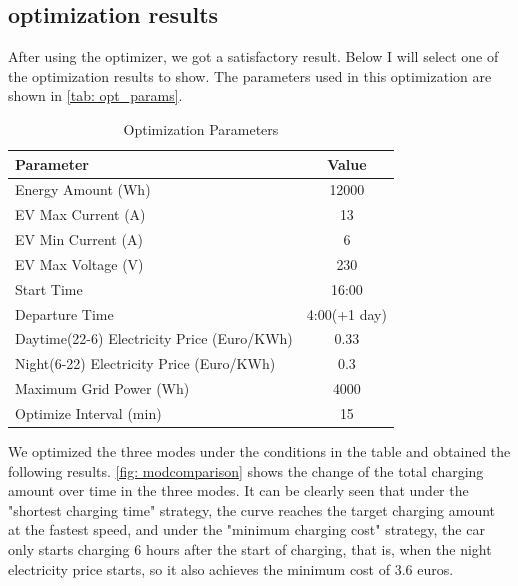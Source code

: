 \documentclass[
	english,
	ruledheaders=section,%
	class=report,%
	thesis={type=Report},%
	accentcolor=9c,%
	custommargins=true,%
	marginpar=false,%
	parskip=half-,%
	fontsize=11pt,%
	logofile={img/tuda_logo.pdf}, %
]{tudapub}
\begin{document}
\subsection{optimization results}

After using the optimizer, we got a satisfactory result. Below I will select one of the optimization results to show. The parameters used in this optimization are shown in \autoref{tab: opt_params}.

\begin{table}[htbp]
\centering
\begin{tabular}{|l|c|}
\hline
\textbf{Parameter} & \textbf{Value} \\
\hline
Energy Amount (Wh)      & 12000 \\
EV Max Current (A)      & 13 \\
EV Min Current (A)      & 6 \\
EV Max Voltage (V)      & 230 \\
Start Time      & 16:00 \\
Departure Time      & 4:00(+1 day) \\
Daytime(22-6) Electricity Price (Euro/KWh)      & 0.33 \\
Night(6-22) Electricity Price (Euro/KWh)     & 0.3 \\
Maximum Grid Power (Wh)      & 4000 \\
Optimize Interval (min)      & 15 \\
\hline
\end{tabular}
\caption{Optimization Parameters}
\label{tab: opt_params}
\end{table}


We optimized the three modes under the conditions in the table and obtained the following results. \autoref{fig: modcomparison} shows the change of the total charging amount over time in the three modes. It can be clearly seen that under the "shortest charging time" strategy, the curve reaches the target charging amount at the fastest speed, and under the "minimum charging cost" strategy, the car only starts charging 6 hours after the start of charging, that is, when the night electricity price starts, so it also achieves the minimum cost of 3.6 euros. 
\end{document}
